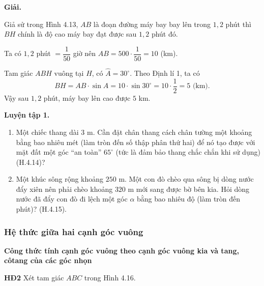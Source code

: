 \begin{lesson}
    \textbf{Giải.}

    Giả sử trong Hình 4.13, $AB$ là đoạn đường máy bay bay lên trong $1{,}2$ phút thì $BH$ chính là độ cao máy bay đạt được sau $1{,}2$ phút đó.

    Ta có $1{,}2$ phút $=\dfrac{1}{50}$ giờ nên $AB=500\cdot\dfrac{1}{50}=10$ (km).

    Tam giác $ABH$ vuông tại $H$, có $\widehat{A}=30^\circ$. Theo Định lí 1, ta có
    \[
        BH=AB\cdot\sin A=10\cdot\sin30^\circ=10\cdot\dfrac{1}{2}=5\text{ (km)}.
    \]
    Vậy sau $1{,}2$ phút, máy bay lên cao được $5$ km.

    \textbf{Luyện tập 1.}
    \begin{enumerate}[label=\arabic*.]
        \item Một chiếc thang dài $3$ m. Cần đặt chân thang cách chân tường một khoảng bằng bao nhiêu mét (làm tròn đến số thập phân thứ hai) để nó tạo được với mặt đất một góc ``an toàn'' $65^\circ$ (tức là đảm bảo thang chắc chắn khi sử dụng) (H.4.14)?

        \answerline
        \answerline
        \item Một khúc sông rộng khoảng $250$ m. Một con đò chèo qua sông bị dòng nước đẩy xiên nên phải chèo khoảng $320$ m mới sang được bờ bên kia. Hỏi dòng nước đã đẩy con đò đi lệch một góc $\alpha$ bằng bao nhiêu độ (làm tròn đến phút)? (H.4.15).

        \answerline
        \answerline
    \end{enumerate}

    \subsubsection{Hệ thức giữa hai cạnh góc vuông}

    \textbf{Công thức tính cạnh góc vuông theo cạnh góc vuông kia và tang, côtang của các góc nhọn}

    \textbf{HĐ2} Xét tam giác $ABC$ trong Hình 4.16.

    \begin{center}


\end{center}
\end{lesson}
